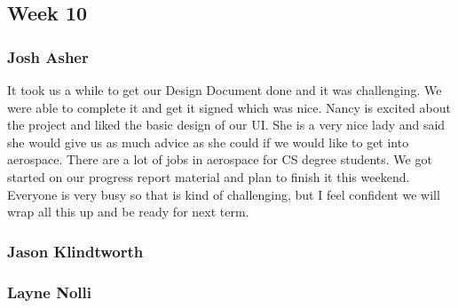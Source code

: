 \documentclass[10pt,draftclsnofoot,onecolumn]{IEEEtran}
\begin{document}
\subsection{Week 10}

\subsubsection{Josh Asher} It took us a while to get our Design Document done and it was challenging. We were able to complete it and get it signed which was nice. Nancy is excited about the project and liked the basic design of our UI. She is a very nice lady and said she would give us as much advice as she could if we would like to get into aerospace. There are a lot of jobs in aerospace for CS degree students. We got started on our progress report material and plan to finish it this weekend. Everyone is very busy so that is kind of challenging, but I feel confident we will wrap all this up and be ready for next term.

\subsubsection{Jason Klindtworth}

\subsubsection{Layne Nolli}
\end{document}
